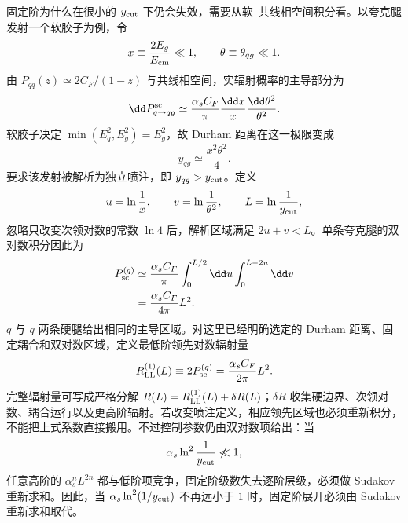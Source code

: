 \begin{exbox}
固定阶为什么在很小的 $y_{\rm cut}$ 下仍会失效，需要从软--共线相空间积分看。以夸克腿发射一个软胶子为例，令
\begin{equation*}
x\equiv\frac{2E_g}{E_{\rm cm}}\ll1,
\qquad \theta\equiv\theta_{qg}\ll1.
\end{equation*}
由 $P_{qq}(z)\simeq2C_F/(1-z)$ 与共线相空间，实辐射概率的主导部分为
\begin{equation*}
\dd P_{q\to qg}^{\rm sc}
\simeq\frac{\alpha_s C_F}{\pi}
\frac{\dd x}{x}\frac{\dd\theta^2}{\theta^2}.
\end{equation*}
软胶子决定 $\min(E_q^2,E_g^2)=E_g^2$，故 Durham 距离在这一极限变成
\begin{equation*}
y_{qg}\simeq\frac{x^2\theta^2}{4}.
\end{equation*}
要求该发射被解析为独立喷注，即 $y_{qg}>y_{\rm cut}$。定义
\begin{equation*}
u=\ln\frac1x,\qquad v=\ln\frac1{\theta^2},\qquad L=\ln\frac1{y_{\rm cut}},
\end{equation*}
忽略只改变次领对数的常数 $\ln4$ 后，解析区域满足 $2u+v<L$。单条夸克腿的双对数积分因此为
\begin{align*}
P_{\rm sc}^{(q)}
&\simeq\frac{\alpha_s C_F}{\pi}
\int_0^{L/2}\dd u\int_0^{L-2u}\dd v\\
&=\frac{\alpha_s C_F}{4\pi}L^2.
\end{align*}
$q$ 与 $\bar q$ 两条硬腿给出相同的主导区域。对这里已经明确选定的 Durham 距离、固定耦合和双对数区域，定义最低阶领先对数辐射量
\begin{equation*}
R_{\rm LL}^{(1)}(L)
\equiv2P_{\rm sc}^{(q)}
=\frac{\alpha_s C_F}{2\pi}L^2.
\end{equation*}
完整辐射量可写成严格分解 $R(L)=R_{\rm LL}^{(1)}(L)+\delta R(L)$；$\delta R$ 收集硬边界、次领对数、耦合运行以及更高阶辐射。若改变喷注定义，相应领先区域也必须重新积分，不能把上式系数直接搬用。不过控制参数仍由双对数项给出：当
\begin{equation*}
\alpha_s\ln^2\frac1{y_{\rm cut}}\not\ll1,
\end{equation*}
任意高阶的 $\alpha_s^nL^{2n}$ 都与低阶项竞争，固定阶级数失去逐阶层级，必须做 Sudakov 重新求和。因此，当 $\alpha_s\ln^2(1/y_{\rm cut})$ 不再远小于 $1$ 时，固定阶展开必须由 Sudakov 重新求和取代。
\end{exbox}






